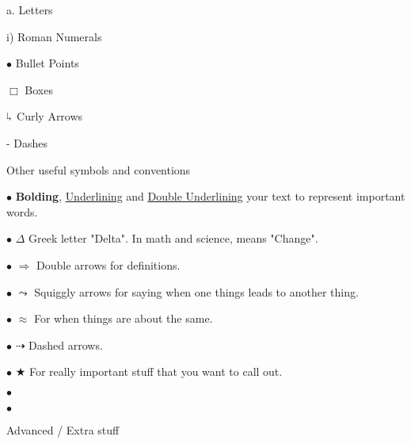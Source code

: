 \documentclass[../main.tex]{subfiles}
\begin{document}
\begin{outline}[enumerate]
\begin{displayquote}
	\quad a. Letters

	\quad \quad i) Roman Numerals

	\quad \(\bullet\) Bullet Points

	\quad \quad $\Box$ Boxes

	\quad $\rotatebox[origin=c]{180}{$\Lsh$}$ Curly Arrows

	\quad \quad - Dashes
	\end{displayquote}


	\1 Other useful symbols and conventions

	$\bullet$ \quad \textbf{Bolding}, \underline{Underlining} and \underline{\underline{Double Underlining}} your text to represent important words.

	$\bullet$ \quad $\Delta$ Greek letter "Delta".  In math and science, means "Change".

	$\bullet$ \quad $\Rightarrow$ Double arrows for definitions.

	$\bullet$ \quad $\leadsto$ Squiggly arrows for saying when one things leads to another thing.

	$\bullet$ \quad $\approx$ For when things are about the same.

	$\bullet$ \quad $\dashrightarrow$ Dashed arrows.

	$\bullet$ \quad $\bigstar$ For really important stuff that you want to call out.

	$\bullet$ \quad {}

	$\bullet$ \quad {}


	\1 Advanced / Extra stuff

	\2 

	\2 \colorbox{dracCyan}{}

	\2 

\end{outline}
\end{document}
